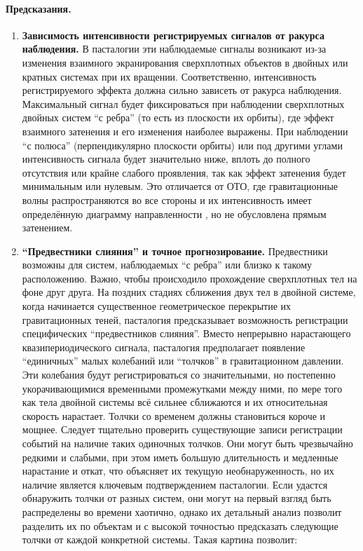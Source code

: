 \documentclass[pdflatex,sn-mathphys-num,referee]{sn-jnl}
\begin{document}
\paragraph{Предсказания.}
\begin{enumerate}
    \item \textbf{Зависимость интенсивности регистрируемых сигналов от ракурса наблюдения.} В пасталогии эти наблюдаемые сигналы возникают из-за изменения взаимного экранирования сверхплотных объектов в двойных или кратных системах при их вращении. Соответственно, интенсивность регистрируемого эффекта должна сильно зависеть от ракурса наблюдения. Максимальный сигнал будет фиксироваться при наблюдении сверхплотных двойных систем ``с ребра'' (то есть из плоскости их орбиты), где эффект взаимного затенения и его изменения наиболее выражены. При наблюдении ``с полюса'' (перпендикулярно плоскости орбиты) или под другими углами интенсивность сигнала будет значительно ниже, вплоть до полного отсутствия или крайне слабого проявления, так как эффект затенения будет минимальным или нулевым. Это отличается от ОТО, где гравитационные волны распространяются во все стороны и их интенсивность имеет определённую диаграмму направленности \cite{maggiore2007-gw}, но не обусловлена прямым затенением.
    \item \textbf{``Предвестники слияния'' и точное прогнозирование.} Предвестники возможны для систем, наблюдаемых ``с ребра'' или близко к такому расположению. Важно, чтобы происходило прохождение сверхплотных тел на фоне друг друга. На поздних стадиях сближения двух тел в двойной системе, когда начинается существенное геометрическое перекрытие их гравитационных теней, пасталогия предсказывает возможность регистрации специфических ``предвестников слияния''. Вместо непрерывно нарастающего квазипериодического сигнала, пасталогия предполагает появление ``единичных'' малых колебаний или ``толчков'' в гравитационном давлении. Эти колебания будут регистрироваться со значительными, но постепенно укорачивающимися временными промежутками между ними, по мере того как тела двойной системы всё сильнее сближаются и их относительная скорость нарастает. Толчки со временем должны становиться короче и мощнее. Следует тщательно проверить существующие записи регистрации событий на наличие таких одиночных толчков. Они могут быть чрезвычайно редкими и слабыми, при этом иметь большую длительность и медленные нарастание и откат, что объясняет их текущую необнаруженность, но их наличие является ключевым подтверждением пасталогии. Если удастся обнаружить толчки от разных систем, они могут на первый взгляд быть распределены во времени хаотично, однако их детальный анализ позволит разделить их по объектам и с высокой точностью предсказать следующие толчки от каждой конкретной системы. Такая картина позволит:

\end{enumerate}
\end{document}
